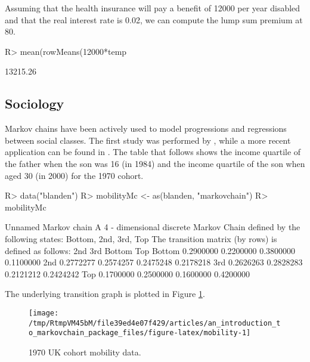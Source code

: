 \documentclass[
  nojss]{jss}
\begin{document}
Assuming that the health insurance will pay a benefit of 12000 per year disabled and that the real interest rate is 0.02, we can compute the lump sum premium at 80.

\begin{CodeChunk}

\begin{CodeInput}
R> mean(rowMeans(12000*temp%
\end{CodeInput}

\begin{CodeOutput}
[1] 13215.26
\end{CodeOutput}
\end{CodeChunk}

\hypertarget{app:sociology}{%
\subsection{Sociology}\label{app:sociology}}

Markov chains have been actively used to model progressions and regressions between social classes. The first study was performed by \cite{glassHall}, while a more recent application can be found in \cite{blandenEtAlii}. The table that follows shows the income quartile of the father when the son was 16 (in 1984) and the income quartile of the son when aged 30 (in 2000) for the 1970 cohort.

\begin{CodeChunk}

\begin{CodeInput}
R> data("blanden")
R> mobilityMc <- as(blanden, "markovchain")
R> mobilityMc
\end{CodeInput}

\begin{CodeOutput}
Unnamed Markov chain 
 A  4 - dimensional discrete Markov Chain defined by the following states: 
 Bottom, 2nd, 3rd, Top 
 The transition matrix  (by rows)  is defined as follows: 
             2nd       3rd    Bottom       Top
Bottom 0.2900000 0.2200000 0.3800000 0.1100000
2nd    0.2772277 0.2574257 0.2475248 0.2178218
3rd    0.2626263 0.2828283 0.2121212 0.2424242
Top    0.1700000 0.2500000 0.1600000 0.4200000
\end{CodeOutput}
\end{CodeChunk}

The underlying transition graph is plotted in Figure \ref{fig:mobility}.

\begin{CodeChunk}
\begin{figure}

{\centering \texttt{[image: /tmp/RtmpVM45bM/file39ed4e07f429/articles/an\_introduction\_to\_markovchain\_package\_files/figure-latex/mobility-1]} 

}

\caption[1970 UK cohort mobility data]{1970 UK cohort mobility data.}\label{fig:mobility}
\end{figure}
\end{CodeChunk}
\end{document}
